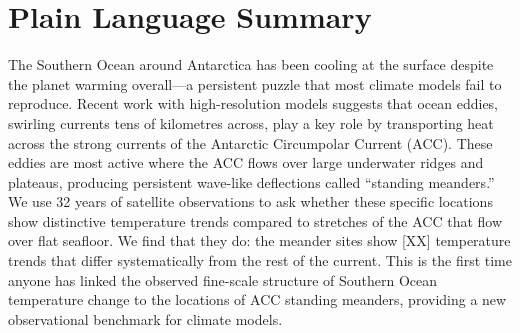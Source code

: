 \documentclass[draft]{agujournal2019}
\begin{document}
\begin{abstract}

The Southern Ocean ``warming hole''---the anomalous surface cooling observed during the satellite era despite increasing greenhouse gas concentrations---has been attributed to eddy-mediated heat transport across Antarctic Circumpolar Current (ACC) fronts.
However, no observational study has tested whether this mechanism leaves a spatial fingerprint at the scale of individual ACC standing meanders.
Here, we co-locate satellite-era sea surface temperature (SST) trends (1993--2025) with structural trends of ACC standing meanders at four major topographic hotspots: the Campbell Plateau, Pacific-Antarctic Ridge, Southeast Indian Ridge, and Southwest Indian Ridge.
We find that SST trends at meander sites differ significantly from those in quiescent ACC sections ($p < [XX]$), with the [XX] pronounced anomalies concentrated downstream of topographic features where eddy kinetic energy trends are strongest.
A circumpolar transect of SST trends along the ACC axis reveals systematic modulation at topographic features, with [XX] at meander sites relative to the circumpolar mean.
These results provide the first meander-scale observational constraint for eddy-resolving climate models and demonstrate that the spatial architecture of Southern Ocean temperature change is governed by the evolving dynamics of ACC standing meanders.

\end{abstract}



\section*{Plain Language Summary}

The Southern Ocean around Antarctica has been cooling at the surface despite the planet warming overall---a persistent puzzle that most climate models fail to reproduce.
Recent work with high-resolution models suggests that ocean eddies, swirling currents tens of kilometres across, play a key role by transporting heat across the strong currents of the Antarctic Circumpolar Current (ACC).
These eddies are most active where the ACC flows over large underwater ridges and plateaus, producing persistent wave-like deflections called ``standing meanders.''
We use 32 years of satellite observations to ask whether these specific locations show distinctive temperature trends compared to stretches of the ACC that flow over flat seafloor.
We find that they do: the meander sites show [XX] temperature trends that differ systematically from the rest of the current.
This is the first time anyone has linked the observed fine-scale structure of Southern Ocean temperature change to the locations of ACC standing meanders, providing a new observational benchmark for climate models.
\end{document}
